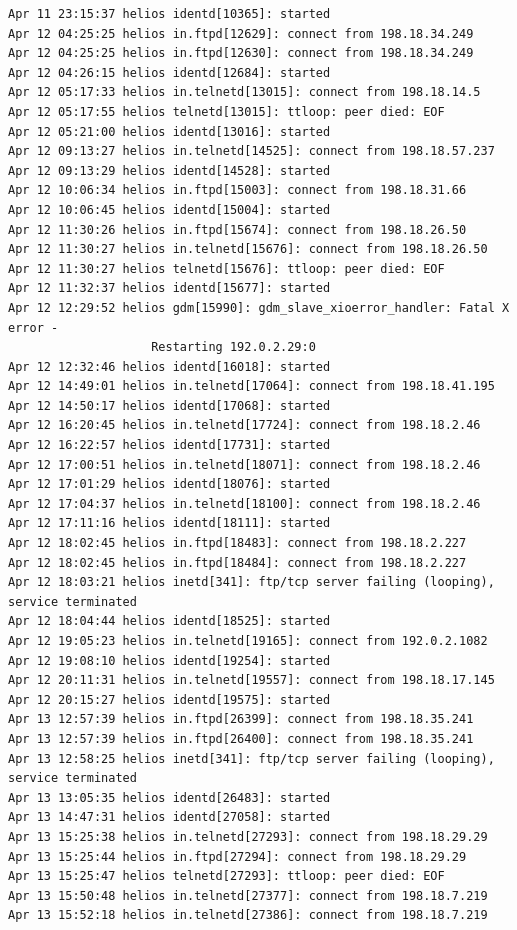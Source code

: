 \begin{lstlisting}[style=terminal]
Apr 11 23:15:37 helios identd[10365]: started
Apr 12 04:25:25 helios in.ftpd[12629]: connect from 198.18.34.249
Apr 12 04:25:25 helios in.ftpd[12630]: connect from 198.18.34.249
Apr 12 04:26:15 helios identd[12684]: started
Apr 12 05:17:33 helios in.telnetd[13015]: connect from 198.18.14.5
Apr 12 05:17:55 helios telnetd[13015]: ttloop: peer died: EOF
Apr 12 05:21:00 helios identd[13016]: started
Apr 12 09:13:27 helios in.telnetd[14525]: connect from 198.18.57.237
Apr 12 09:13:29 helios identd[14528]: started
Apr 12 10:06:34 helios in.ftpd[15003]: connect from 198.18.31.66
Apr 12 10:06:45 helios identd[15004]: started
Apr 12 11:30:26 helios in.ftpd[15674]: connect from 198.18.26.50
Apr 12 11:30:27 helios in.telnetd[15676]: connect from 198.18.26.50
Apr 12 11:30:27 helios telnetd[15676]: ttloop: peer died: EOF
Apr 12 11:32:37 helios identd[15677]: started
Apr 12 12:29:52 helios gdm[15990]: gdm_slave_xioerror_handler: Fatal X error - 
                    Restarting 192.0.2.29:0
Apr 12 12:32:46 helios identd[16018]: started
Apr 12 14:49:01 helios in.telnetd[17064]: connect from 198.18.41.195
Apr 12 14:50:17 helios identd[17068]: started
Apr 12 16:20:45 helios in.telnetd[17724]: connect from 198.18.2.46
Apr 12 16:22:57 helios identd[17731]: started
Apr 12 17:00:51 helios in.telnetd[18071]: connect from 198.18.2.46
Apr 12 17:01:29 helios identd[18076]: started
Apr 12 17:04:37 helios in.telnetd[18100]: connect from 198.18.2.46
Apr 12 17:11:16 helios identd[18111]: started
Apr 12 18:02:45 helios in.ftpd[18483]: connect from 198.18.2.227
Apr 12 18:02:45 helios in.ftpd[18484]: connect from 198.18.2.227
Apr 12 18:03:21 helios inetd[341]: ftp/tcp server failing (looping), service terminated
Apr 12 18:04:44 helios identd[18525]: started
Apr 12 19:05:23 helios in.telnetd[19165]: connect from 192.0.2.1082
Apr 12 19:08:10 helios identd[19254]: started
Apr 12 20:11:31 helios in.telnetd[19557]: connect from 198.18.17.145
Apr 12 20:15:27 helios identd[19575]: started
Apr 13 12:57:39 helios in.ftpd[26399]: connect from 198.18.35.241
Apr 13 12:57:39 helios in.ftpd[26400]: connect from 198.18.35.241
Apr 13 12:58:25 helios inetd[341]: ftp/tcp server failing (looping), service terminated
Apr 13 13:05:35 helios identd[26483]: started
Apr 13 14:47:31 helios identd[27058]: started
Apr 13 15:25:38 helios in.telnetd[27293]: connect from 198.18.29.29
Apr 13 15:25:44 helios in.ftpd[27294]: connect from 198.18.29.29
Apr 13 15:25:47 helios telnetd[27293]: ttloop: peer died: EOF
Apr 13 15:50:48 helios in.telnetd[27377]: connect from 198.18.7.219
Apr 13 15:52:18 helios in.telnetd[27386]: connect from 198.18.7.219

\end{lstlisting}
